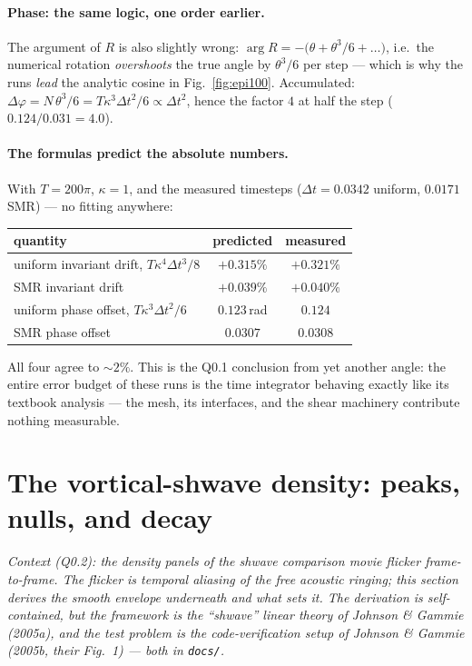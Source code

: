 \documentclass[11pt]{article}
\begin{document}
\paragraph{Phase: the same logic, one order earlier.}
The argument of $R$ is also slightly wrong:
$\arg R = -\big(\theta + \theta^3/6 + \ldots\big)$, i.e.\ the numerical
rotation \emph{overshoots} the true angle by $\theta^3/6$ per step --- which is
why the runs \emph{lead} the analytic cosine in Fig.~\ref{fig:epi100}. Accumulated:
$\Delta\varphi = N\,\theta^3/6 = T\kappa^3\Delta t^2/6 \propto \Delta t^2$,
hence the factor $4$ at half the step ($0.124/0.031 = 4.0$).

\paragraph{The formulas predict the absolute numbers.}
With $T = 200\pi$, $\kappa = 1$, and the measured timesteps
($\Delta t = 0.0342$ uniform, $0.0171$ SMR) --- no fitting anywhere:
\begin{center}\small
\begin{tabular}{@{}lcc@{}}
\toprule
quantity & predicted & measured\\
\midrule
uniform invariant drift, $T\kappa^4\Delta t^3/8$ & $+0.315\%$ & $+0.321\%$\\
SMR invariant drift & $+0.039\%$ & $+0.040\%$\\
uniform phase offset, $T\kappa^3\Delta t^2/6$ & $0.123$\,rad & $0.124$\\
SMR phase offset & $0.0307$ & $0.0308$\\
\bottomrule
\end{tabular}
\end{center}
All four agree to $\sim\!2\%$. This is the Q0.1 conclusion from yet another
angle: the entire error budget of these runs is the time integrator behaving
exactly like its textbook analysis --- the mesh, its interfaces, and the shear
machinery contribute nothing measurable.

\clearpage
\section{The vortical-shwave density: peaks, nulls, and decay}
\label{sec:shw}

\noindent\emph{Context (Q0.2): the density panels of the shwave comparison movie
flicker frame-to-frame. The flicker is temporal aliasing of the free acoustic
ringing; this section derives the smooth envelope underneath and what sets it.
The derivation is self-contained, but the framework is the ``shwave'' linear
theory of Johnson \& Gammie (2005a), and the test problem is the code-verification
setup of Johnson \& Gammie (2005b, their Fig.~1) --- both in \texttt{docs/}.}
\end{document}
